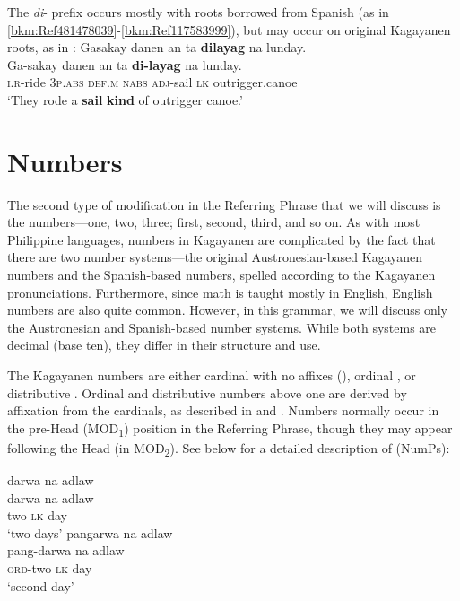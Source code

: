 The \textit{di}- prefix occurs mostly with roots borrowed from Spanish (as in \ref{bkm:Ref481478039}{}-\ref{bkm:Ref117583999}), but may occur on original Kagayanen roots, as in :
\ea
\label{bkm:Ref113279533}
Gasakay  danen  an  ta    \textbf{dilayag}  na  lunday. \\\smallskip
 \gll Ga-sakay  danen  an  ta    \textbf{di-layag}  na  lunday. \\
\textsc{i.r}-ride  3\textsc{p.abs}  \textsc{def.m}  \textsc{nabs}  \textsc{adj}-sail \textsc{lk} outrigger.canoe \\
\glt ‘They rode a \textbf{sail} \textbf{kind} of outrigger canoe.’
\z

\section{Numbers}
\label{sec:numbers} 

The second type of modification in the Referring Phrase that we will discuss is the numbers---one, two, three; first, second, third, and so on. As with most Philippine languages, numbers in Kagayanen are complicated by the fact that there are two number systems---the original Austronesian-based Kagayanen numbers and the Spanish-based numbers, spelled according to the Kagayanen pronunciations. Furthermore, since math is taught mostly in English, English numbers are also quite common. However, in this grammar, we will discuss only the Austronesian and Spanish-based number systems. While both systems are decimal (base ten), they differ in their structure and use.

The Kagayanen numbers are either cardinal with no affixes (), ordinal , or distributive . Ordinal and distributive numbers above one are derived by affixation from the cardinals, as described in  and . Numbers normally occur in the pre-Head (MOD\textsubscript{1}) position in the Referring Phrase, though they may appear following the Head (in MOD\textsubscript{2}). See  below for a detailed description of  (NumPs):

\ea
darwa  na  adlaw \\\smallskip
 \gll darwa  na  adlaw \\
two  \textsc{lk}   day \\
\glt `two days'
\z
\ea
pangarwa   na  adlaw \\\smallskip
 \gll pang-darwa   na  adlaw \\
\textsc{ord}-two  \textsc{lk}  day \\
\glt ‘second day’
\z

